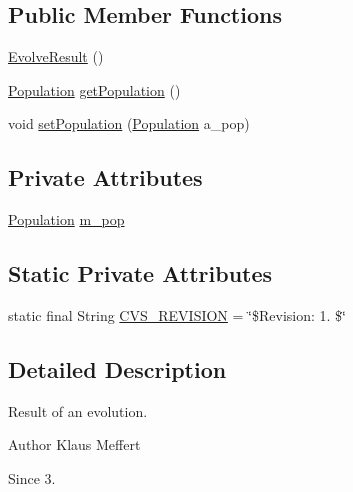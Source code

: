 \subsection*{Public Member Functions}
\begin{DoxyCompactItemize}
\item 
\hyperlink{classorg_1_1jgap_1_1impl_1_1job_1_1_evolve_result_ac4bd7277c1c3e5af86fd5ca7242ef8c7}{Evolve\-Result} ()
\item 
\hyperlink{classorg_1_1jgap_1_1_population}{Population} \hyperlink{classorg_1_1jgap_1_1impl_1_1job_1_1_evolve_result_a5e5da5c07c169d370b20c572ade6bbfd}{get\-Population} ()
\item 
void \hyperlink{classorg_1_1jgap_1_1impl_1_1job_1_1_evolve_result_a50419dfc00628120fa6e5552f20c71fd}{set\-Population} (\hyperlink{classorg_1_1jgap_1_1_population}{Population} a\-\_\-pop)
\end{DoxyCompactItemize}
\subsection*{Private Attributes}
\begin{DoxyCompactItemize}
\item 
\hyperlink{classorg_1_1jgap_1_1_population}{Population} \hyperlink{classorg_1_1jgap_1_1impl_1_1job_1_1_evolve_result_a8569b061c7ecf7a6c711e825c33a5104}{m\-\_\-pop}
\end{DoxyCompactItemize}
\subsection*{Static Private Attributes}
\begin{DoxyCompactItemize}
\item 
static final String \hyperlink{classorg_1_1jgap_1_1impl_1_1job_1_1_evolve_result_a917b8af527483f14be0e708e36b04d2d}{C\-V\-S\-\_\-\-R\-E\-V\-I\-S\-I\-O\-N} = \char`\"{}\$Revision\-: 1. \$\char`\"{}
\end{DoxyCompactItemize}


\subsection{Detailed Description}
Result of an evolution.

\begin{DoxyAuthor}{Author}
Klaus Meffert 
\end{DoxyAuthor}
\begin{DoxySince}{Since}
3. 
\end{DoxySince}


